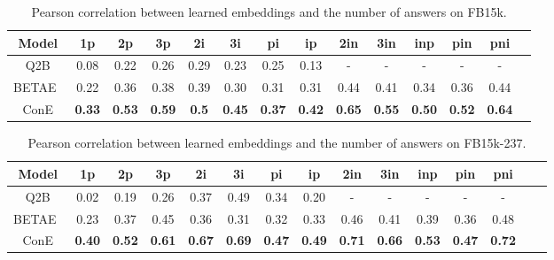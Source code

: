 \documentclass{article}
\newcommand{\betae}{{\normalsize{B}\footnotesize{ETA}\normalsize{E}}}
\begin{document}
\begin{table}[!ht]
    \centering
    \caption{Pearson correlation between learned embeddings and the number of answers on FB15k.}
    \label{table:pearson_fb}
    \vspace{1mm}
    \begin{tabular}{c c c  c c c c  c c c c c c c}
        \toprule
         \textbf{Model} &\textbf{1p} &\textbf{2p} &\textbf{3p} &\textbf{2i} &\textbf{3i} &\textbf{pi} &\textbf{ip} &\textbf{2in} &\textbf{3in} &\textbf{inp} &\textbf{pin} &\textbf{pni} \\
        \midrule
        Q2B &0.08 &0.22 &0.26 &0.29 &0.23 &0.25 &0.13 &- &- &- &- &- \\
        \betae~ &0.22 &0.36 &0.38 &0.39 &0.30 &0.31 &0.31 &0.44 &0.41 &0.34 & 0.36 &0.44\\
        ConE &\textbf{0.33} &\textbf{0.53} &\textbf{0.59} &\textbf{0.5} &\textbf{0.45} &\textbf{0.37} &\textbf{0.42} &\textbf{0.65} &\textbf{0.55} &\textbf{0.50} & \textbf{0.52} &\textbf{0.64} \\
        \bottomrule
    \end{tabular}
   \vspace{-1mm}
\end{table}

\begin{table}[!ht]
    \centering
    \caption{Pearson correlation between learned embeddings and the number of answers on FB15k-237.}
    \label{table:pearson_fb237}
    \vspace{1mm}
    \begin{tabular}{c c c  c c c c  c c c c c c c c}
        \toprule
         \textbf{Model} &\textbf{1p} &\textbf{2p} &\textbf{3p} &\textbf{2i} &\textbf{3i} &\textbf{pi} &\textbf{ip} &\textbf{2in} &\textbf{3in} &\textbf{inp} &\textbf{pin} &\textbf{pni} \\
        \midrule
        Q2B &0.02 &0.19 &0.26 &0.37 &0.49 &0.34 &0.20 &- &- &- &- &-\\
        \betae~ &0.23 &0.37 &0.45 &0.36 &0.31 &0.32 &0.33 &0.46 &0.41 &0.39 & 0.36 &0.48 \\
        ConE &\textbf{0.40} & \textbf{0.52} &\textbf{0.61} &\textbf{0.67} &\textbf{0.69} &\textbf{0.47} &\textbf{0.49} &\textbf{0.71} &\textbf{0.66} &\textbf{0.53} &\textbf{0.47} &\textbf{0.72} \\
        \bottomrule
    \end{tabular}
\end{table}
\end{document}
